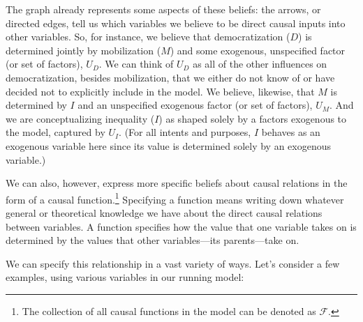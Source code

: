 \documentclass[12pt,]{book}
\let\rmarkdownfootnote\footnote%
\def\footnote{\protect\rmarkdownfootnote}
\begin{document}
The graph already represents some aspects of these beliefs: the arrows, or directed edges, tell us which variables we believe to be direct causal inputs into other variables. So, for instance, we believe that democratization (\(D\)) is determined jointly by mobilization (\(M\)) and some exogenous, unspecified factor (or set of factors), \(U_D\). We can think of \(U_D\) as all of the other influences on democratization, besides mobilization, that we either do not know of or have decided not to explicitly include in the model. We believe, likewise, that \(M\) is determined by \(I\) and an unspecified exogenous factor (or set of factors), \(U_M\). And we are conceptualizing inequality (\(I\)) as shaped solely by a factors exogenous to the model, captured by \(U_I\). (For all intents and purposes, \(I\) behaves as an exogenous variable here since its value is determined solely by an exogenous variable.)

We can also, however, express more specific beliefs about causal relations in the form of a causal function.\footnote{The collection of all causal functions in the model can be denoted as \(\mathcal{F}\).} Specifying a function means writing down whatever general or theoretical knowledge we have about the direct causal relations between variables. A function specifies how the value that one variable takes on is determined by the values that other variables---its parents---take on.

We can specify this relationship in a vast variety of ways. Let's consider a few examples, using various variables in our running model:
\end{document}
